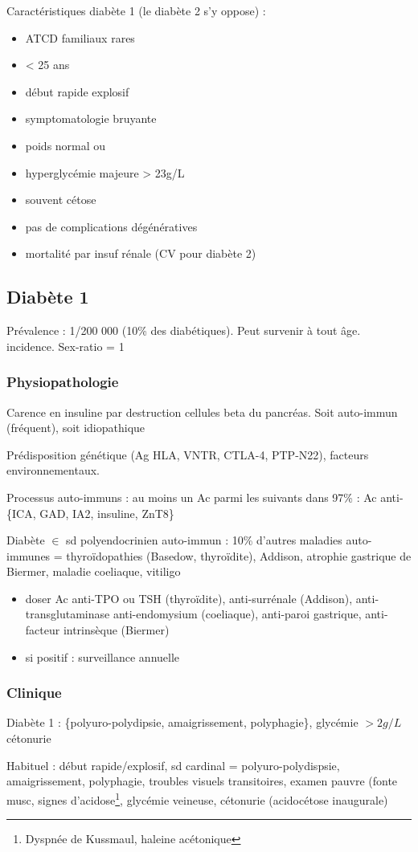 \documentclass[11pt]{article}
\begin{document}
Caractéristiques diabète 1 (le diabète 2 s'y oppose) : 
\begin{itemize}
\item ATCD familiaux rares
\item < 25 ans
\item début rapide explosif
\item symptomatologie bruyante
\item poids normal ou \dec
\item hyperglycémie majeure > 23g/L
\item souvent cétose
\item pas de complications dégénératives
\item mortalité par insuf rénale (CV pour diabète 2)
\end{itemize}

\subsection{Diabète 1}
\label{sec:org5962e9e}
Prévalence : 1/200 000 (10\% des diabétiques). Peut survenir à tout âge. \inc
incidence. Sex-ratio = 1

\subsubsection{Physiopathologie}
\label{sec:orgad5d6aa}
Carence en insuline par destruction cellules beta du pancréas. Soit auto-immun
(fréquent), soit idiopathique

Prédisposition génétique (Ag HLA, VNTR, CTLA-4, PTP-N22), facteurs
environnementaux.

Processus auto-immuns : au moins un Ac parmi les suivants dans 97\% : Ac
anti-\{ICA, GAD, IA2, insuline, ZnT8\}

Diabète \(\in\) sd polyendocrinien auto-immun : 10\% d'autres maladies auto-immunes =
thyroïdopathies (Basedow, thyroïdite), Addison, atrophie gastrique de Biermer,
maladie coeliaque, vitiligo 
\begin{itemize}
\item doser Ac anti-TPO ou TSH (thyroïdite), anti-surrénale (Addison), anti-transglutaminase \textpm{} anti-endomysium (coeliaque), anti-paroi gastrique, anti-facteur intrinsèque (Biermer)
\item si positif : surveillance annuelle
\end{itemize}

\subsubsection{Clinique}
\label{sec:org404e80d}
\begin{tcolorbox}
Diabète 1 : \{polyuro-polydipsie, amaigrissement, polyphagie\}, glycémie $> 2g/L$ \pm cétonurie
\end{tcolorbox}
Habituel : début rapide/explosif, sd cardinal = polyuro-polydispsie,
amaigrissement, polyphagie, troubles visuels transitoires, examen pauvre (fonte
musc, signes d'acidose\footnote{Dyspnée de Kussmaul, haleine acétonique}, glycémie veineuse, cétonurie (acidocétose
inaugurale)
\end{document}
